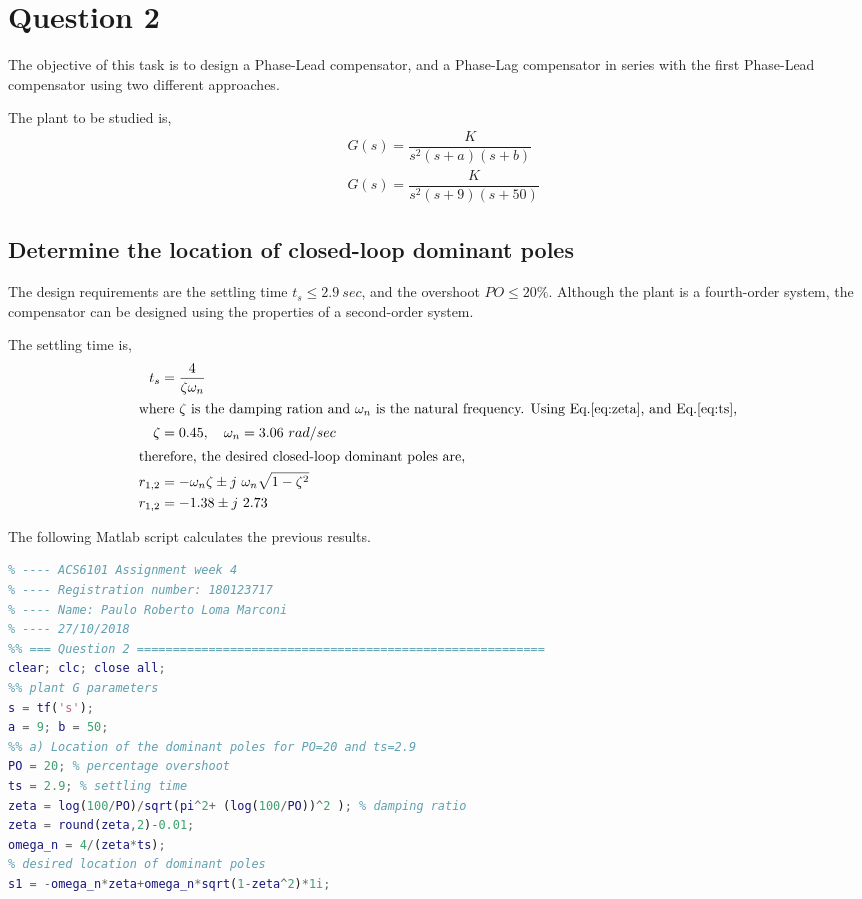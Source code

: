 \documentclass[11pt, a4paper]{article}
\begin{document}
\section{Question 2}
The objective of this task is to design a Phase-Lead compensator, and a Phase-Lag compensator in series with the first Phase-Lead compensator using two different approaches. 

The plant to be studied is,
\begin{align}
& G(s)=\dfrac{K}{s^2(s+a)(s+b)} \label{eq:G2}\\
& G(s)=\dfrac{K}{s^2(s+9)(s+50)} \nonumber
\end{align} 

\subsection{Determine the location of closed-loop dominant poles}
The design requirements are the settling time $t_s\leq 2.9~ sec$, and the overshoot $PO\leq 20\%$. Although the plant is a fourth-order system, the compensator can be designed using the properties of a second-order system. 

The settling time is,
\begin{align}
t_s &= \frac{4}{\zeta\omega_n} \label{eq:ts}\\
\intertext{where $\zeta$ is the damping ration and $\omega_n$ is the natural frequency. Using Eq.\eqref{eq:zeta}, and Eq.\eqref{eq:ts},}
\zeta &= 0.45, \quad \omega_n = 3.06 ~rad/sec \nonumber\\
\intertext{therefore, the desired closed-loop dominant poles are,}
r_{1,2} &= -\omega_n\zeta\pm j~\omega_n\sqrt{1-\zeta^2}\\
r_{1,2} &= -1.38\pm j~2.73 \nonumber
\end{align}

The following Matlab script calculates the previous results.
\begin{lstlisting}[language=matlab, caption={}, label={}]
%% ========================================================================
% ---- ACS6101 Assignment week 4
% ---- Registration number: 180123717
% ---- Name: Paulo Roberto Loma Marconi
% ---- 27/10/2018
%% === Question 2 =========================================================
clear; clc; close all;
%% plant G parameters
s = tf('s');
a = 9; b = 50;
%% a) Location of the dominant poles for PO=20 and ts=2.9
PO = 20; % percentage overshoot
ts = 2.9; % settling time
zeta = log(100/PO)/sqrt(pi^2+ (log(100/PO))^2 ); % damping ratio
zeta = round(zeta,2)-0.01;
omega_n = 4/(zeta*ts);
% desired location of dominant poles
s1 = -omega_n*zeta+omega_n*sqrt(1-zeta^2)*1i;
\end{lstlisting}
\end{document}
